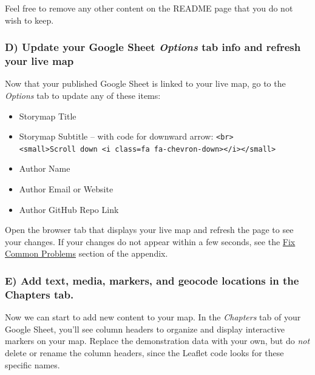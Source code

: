 \documentclass[
  english,
]{book}
\providecommand{\tightlist}{%
  \setlength{\itemsep}{0pt}\setlength{\parskip}{0pt}}
\begin{document}
Feel free to remove any other content on the README page that you do not wish to keep.

\hypertarget{d-update-your-google-sheet-options-tab-info-and-refresh-your-live-map-1}{%
\subsubsection*{\texorpdfstring{D) Update your Google Sheet \emph{Options} tab info and refresh your live map}{D) Update your Google Sheet Options tab info and refresh your live map}}\label{d-update-your-google-sheet-options-tab-info-and-refresh-your-live-map-1}}

Now that your published Google Sheet is linked to your live map, go to the \emph{Options} tab to update any of these items:

\begin{itemize}
\tightlist
\item
  Storymap Title
\item
  Storymap Subtitle -- with code for downward arrow: \texttt{\textless{}br\textgreater{}\textless{}small\textgreater{}Scroll\ down\ \textless{}i\ class=\textquotesingle{}fa\ fa-chevron-down\textquotesingle{}\textgreater{}\textless{}/i\textgreater{}\textless{}/small\textgreater{}}
\item
  Author Name
\item
  Author Email or Website
\item
  Author GitHub Repo Link
\end{itemize}

Open the browser tab that displays your live map and refresh the page to see your changes. If your changes do not appear within a few seconds, see the \href{fix.html}{Fix Common Problems} section of the appendix.

\hypertarget{e-add-text-media-markers-and-geocode-locations-in-the-chapters-tab.}{%
\subsubsection*{E) Add text, media, markers, and geocode locations in the Chapters tab.}\label{e-add-text-media-markers-and-geocode-locations-in-the-chapters-tab.}}

Now we can start to add new content to your map. In the \emph{Chapters} tab of your Google Sheet, you'll see column headers to organize and display interactive markers on your map. Replace the demonstration data with your own, but do \emph{not} delete or rename the column headers, since the Leaflet code looks for these specific names.
\end{document}
